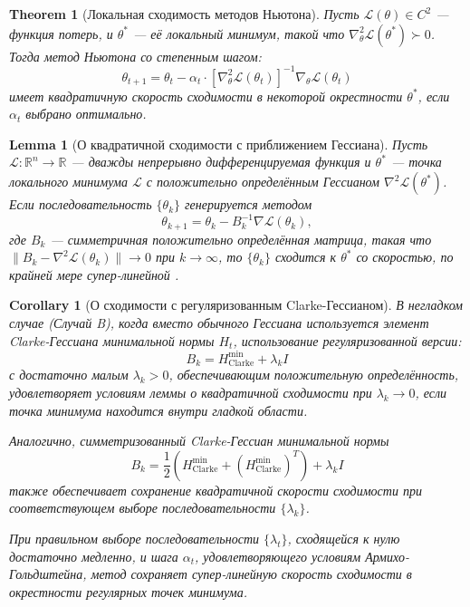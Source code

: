 \documentclass[11pt]{article}
\newtheorem{theorem}{Theorem}
\newtheorem{lemma}{Lemma}
\newtheorem{corollary}{Corollary}
\begin{document}
\begin{theorem}[Локальная сходимость методов Ньютона]
  Пусть $\mathcal{L}(\theta) \in C^2$ — функция потерь, и $\theta^*$ — её локальный минимум, такой что
  $\nabla^2_\theta \mathcal{L}(\theta^*) \succ 0$. Тогда метод Ньютона со степенным шагом:
  \[
    \theta_{t+1} = \theta_t - \alpha_t \cdot [\nabla^2_\theta \mathcal{L}(\theta_t)]^{-1} \nabla_\theta
    \mathcal{L}(\theta_t)
  \]
  имеет квадратичную скорость сходимости в некоторой окрестности $\theta^*$, если $\alpha_t$ выбрано оптимально.
\end{theorem}

\begin{lemma}[О квадратичной сходимости с приближением Гессиана]
  Пусть $\mathcal{L}: \mathbb{R}^n \to \mathbb{R}$ — дважды непрерывно дифференцируемая функция и $\theta^*$
  — точка локального минимума $\mathcal{L}$ с положительно определённым Гессианом $\nabla^2
  \mathcal{L}(\theta^*)$. Если последовательность $\{\theta_k\}$ генерируется методом
  \[
    \theta_{k+1} = \theta_k - B_k^{-1} \nabla \mathcal{L}(\theta_k),
  \]
  где $B_k$ — симметричная положительно определённая матрица, такая что $\|B_k - \nabla^2
  \mathcal{L}(\theta_k)\| \to 0$ при $k \to \infty$, то $\{\theta_k\}$ сходится к $\theta^*$ со скоростью, по
  крайней мере супер-линейной \citep{nocedal2006numerical}.
\end{lemma}

\begin{corollary}[О сходимости с регуляризованным Clarke-Гессианом]
  В негладком случае (Случай B), когда вместо обычного Гессиана используется элемент Clarke-Гессиана
  минимальной нормы $H_t$, использование регуляризованной версии:
  \[
    B_k = H_{\text{Clarke}}^{\text{min}} + \lambda_k I
  \]
  с достаточно малым $\lambda_k > 0$, обеспечивающим положительную определённость, удовлетворяет условиям
  леммы о квадратичной сходимости при $\lambda_k \to 0$, если точка минимума находится внутри гладкой области.

  Аналогично, симметризованный Clarke-Гессиан минимальной нормы
  \[
    B_k = \frac{1}{2}(H_{\text{Clarke}}^{\text{min}} + (H_{\text{Clarke}}^{\text{min}})^T) + \lambda_k I
  \]
  также обеспечивает сохранение квадратичной скорости сходимости при соответствующем выборе
  последовательности $\{\lambda_k\}$.

  При правильном выборе последовательности $\{\lambda_t\}$, сходящейся к нулю достаточно медленно, и шага
  $\alpha_t$, удовлетворяющего условиям Армихо-Гольдштейна, метод сохраняет супер-линейную скорость
  сходимости в окрестности регулярных точек минимума.
\end{corollary}
\end{document}
